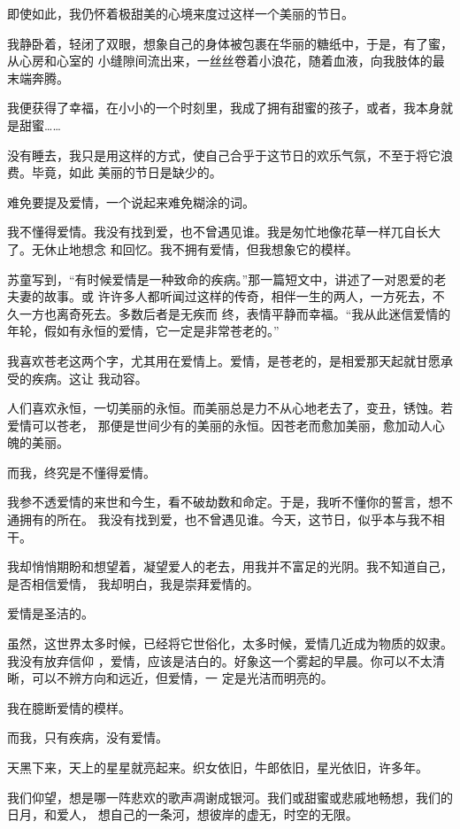 \documentclass[12pt,a4paper]{article}
\begin{document}
		即使如此，我仍怀着极甜美的心境来度过这样一个美丽的节日。


		我静卧着，轻闭了双眼，想象自己的身体被包裹在华丽的糖纸中，于是，有了蜜，从心房和心室的
	小缝隙间流出来，一丝丝卷着小浪花，随着血液，向我肢体的最末端奔腾。

		我便获得了幸福，在小小的一个时刻里，我成了拥有甜蜜的孩子，或者，我本身就是甜蜜……


		没有睡去，我只是用这样的方式，使自己合乎于这节日的欢乐气氛，不至于将它浪费。毕竟，如此
	美丽的节日是缺少的。


		难免要提及爱情，一个说起来难免糊涂的词。


		我不懂得爱情。我没有找到爱，也不曾遇见谁。我是匆忙地像花草一样兀自长大了。无休止地想念
	和回忆。我不拥有爱情，但我想象它的模样。


		苏童写到，“有时候爱情是一种致命的疾病。”那一篇短文中，讲述了一对恩爱的老夫妻的故事。或
	许许多人都听闻过这样的传奇，相伴一生的两人，一方死去，不久一方也离奇死去。多数后者是无疾而
	终，表情平静而幸福。“我从此迷信爱情的年轮，假如有永恒的爱情，它一定是非常苍老的。”

		我喜欢苍老这两个字，尤其用在爱情上。爱情，是苍老的，是相爱那天起就甘愿承受的疾病。这让
	我动容。

		人们喜欢永恒，一切美丽的永恒。而美丽总是力不从心地老去了，变丑，锈蚀。若爱情可以苍老，
	那便是世间少有的美丽的永恒。因苍老而愈加美丽，愈加动人心魄的美丽。

		而我，终究是不懂得爱情。


		我参不透爱情的来世和今生，看不破劫数和命定。于是，我听不懂你的誓言，想不通拥有的所在。
	我没有找到爱，也不曾遇见谁。今天，这节日，似乎本与我不相干。


		我却悄悄期盼和想望着，凝望爱人的老去，用我并不富足的光阴。我不知道自己，是否相信爱情，
	我却明白，我是崇拜爱情的。

		爱情是圣洁的。

		虽然，这世界太多时候，已经将它世俗化，太多时候，爱情几近成为物质的奴隶。我没有放弃信仰
	，爱情，应该是洁白的。好象这一个雾起的早晨。你可以不太清晰，可以不辨方向和远近，但爱情，一
	定是光洁而明亮的。


		我在臆断爱情的模样。

		而我，只有疾病，没有爱情。


		天黑下来，天上的星星就亮起来。织女依旧，牛郎依旧，星光依旧，许多年。


		我们仰望，想是哪一阵悲欢的歌声凋谢成银河。我们或甜蜜或悲戚地畅想，我们的日月，和爱人，
	想自己的一条河，想彼岸的虚无，时空的无限。
\end{document}
